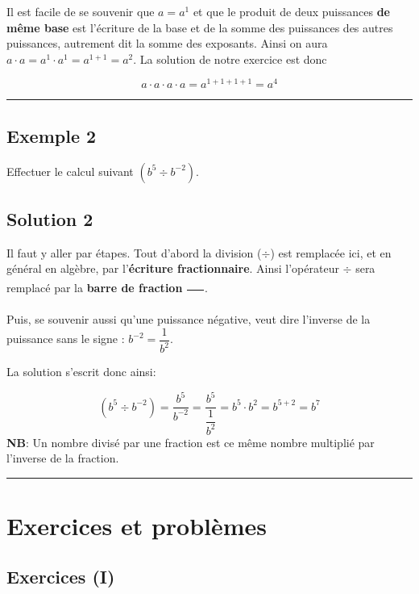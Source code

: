 \documentclass[
  12pt,
]{book}
\begin{document}
Il est facile de se souvenir que \(a= a^1\) et que le produit de deux puissances \textbf{de même base} est l'écriture de la base et de la somme des puissances des autres puissances, autrement dit la somme des exposants. Ainsi on aura \(a\cdot a= a^1\cdot a^1=a^{1+1}=a^2\). La solution de notre exercice est donc

\[a\cdot a\cdot a\cdot a = a^{1+ 1+ 1+ 1}= a^4\]

\begin{center}\rule{0.5\linewidth}{0.5pt}\end{center}

\hypertarget{exemple-2-1}{%
\subsection{Exemple 2}\label{exemple-2-1}}

Effectuer le calcul suivant \((b^5\div b^{-2})\).

\hypertarget{solution-2}{%
\subsection*{Solution 2}\label{solution-2}}

Il faut y aller par étapes. Tout d'abord la division (\(\div\)) est remplacée ici, et en général en algèbre, par l'\textbf{écriture fractionnaire}. Ainsi l'opérateur \(\div\) sera remplacé par la \textbf{barre de fraction} \(\dfrac{\phantom{AA}}{\phantom{AA}}\).

Puis, se souvenir aussi qu'une puissance négative, veut dire l'inverse de la puissance sans le signe : \(b^{-2}=\dfrac{1}{b^2}\).

La solution s'escrit donc ainsi:

\[(b^5\div b^{-2})=\dfrac{b^5}{b^{-2}}=\dfrac{b^5}{\dfrac{1}{b^2}}=b^5\cdot b^2=b^{5+2}=b^7\]
\textbf{NB}: Un nombre divisé par une fraction est ce même nombre multiplié par l'inverse de la fraction.

\begin{center}\rule{0.5\linewidth}{0.5pt}\end{center}

\hypertarget{exercices-et-probluxe8mes}{%
\section{Exercices et problèmes}\label{exercices-et-probluxe8mes}}

\hypertarget{exercices-i}{%
\subsection{Exercices (I)}\label{exercices-i}}
\end{document}
